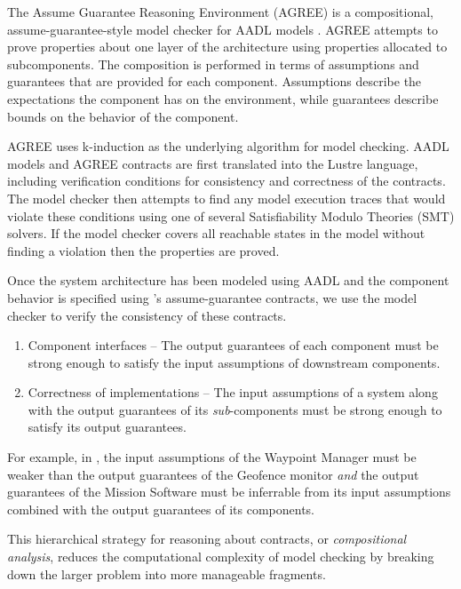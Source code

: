 
The Assume Guarantee Reasoning Environment (AGREE) is a compositional, assume-guarantee-style model
checker for AADL models \cite{compositional-analysis-agree}. AGREE attempts to prove properties about one layer
of the architecture using properties allocated to subcomponents. The composition is performed in
terms of assumptions and guarantees that are provided for each component. Assumptions describe the
expectations the component has on the environment, while guarantees describe bounds on the behavior
of the component. 

AGREE uses k-induction as the underlying algorithm for model checking.  AADL models and AGREE
contracts are first translated into the Lustre language, including verification conditions for consistency
and correctness of the contracts.  The model checker then attempts to find any model execution traces
that would violate these conditions using one of several Satisfiability Modulo Theories (SMT) solvers. 
If the model checker covers all reachable states in the model without finding a violation then the properties are proved. 

Once the system architecture has been modeled using AADL
and the component behavior is specified using \agree's assume-guarantee contracts,
we use the \agree{} model checker to verify the consistency of these contracts.

\begin{enumerate}
\item Component interfaces -- The output guarantees of each component must be strong enough to
satisfy the input assumptions of downstream components. 
\item Correctness of implementations -- The input assumptions of a system along with the 
output guarantees of its \emph{sub}-components must be strong enough to satisfy its output guarantees.
\end{enumerate}

For example, in ,
the input assumptions of the Waypoint Manager must be weaker than
the output guarantees of the Geofence monitor 
\textit{and} the output guarantees of the Mission Software must be inferrable from
its input assumptions combined with the output guarantees of its components.

This hierarchical strategy for reasoning about contracts,
or \emph{compositional analysis},
reduces the computational complexity of model checking
by breaking down the larger problem into more manageable fragments.
